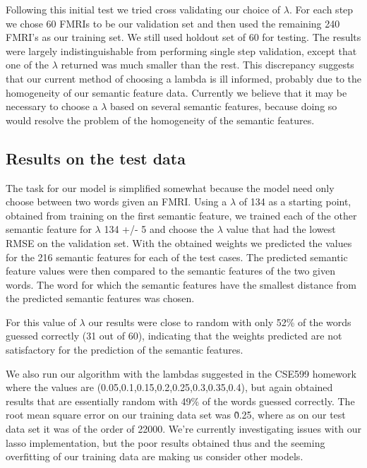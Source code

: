 \documentclass{article} %
\begin{document}
Following this initial test we tried cross validating our choice of $\lambda$. For each step we chose 60 FMRIs to be our validation set and then used the remaining 240 FMRI's as our training set. We still used holdout set of 60 for testing. The results were largely indistinguishable from performing single step validation, except that one of the $\lambda$ returned was much smaller than the rest. This discrepancy suggests that our current method of choosing a lambda is ill informed, probably due to the homogeneity of our semantic feature data. Currently we believe that it may be necessary to choose a $\lambda$ based on several semantic features, because doing so would resolve the problem of the homogeneity of the semantic features.



\subsection{Results on the test data}

The task for our model is simplified somewhat because the model need only choose between two words given an FMRI. Using a $\lambda$ of 134 as a starting point, obtained from training on the first semantic feature, we trained each of the other semantic feature for $\lambda$ 134 +/- 5 and choose the $\lambda$ value that had the lowest RMSE on the validation set. With the obtained weights we predicted the values for the 216 semantic features for each of the test cases. The predicted semantic feature values were then compared to the semantic features of the two given words. The word for which the semantic features have the smallest distance from the predicted semantic features was chosen. 

For this value of $\lambda$ our results were close to random with only 52\% of the words guessed correctly (31 out of 60), indicating that the weights predicted are not satisfactory for the prediction of the semantic features.

We also run our algorithm with the lambdas suggested in the CSE599 homework where the values are (0.05,0.1,0.15,0.2,0.25,0.3,0.35,0.4), but again obtained results that are essentially random with 49\% of the words guessed correctly. The root mean square error on our training data set was \~0.25, where as on our test data set it was of the order of 22000. We're currently investigating issues with our lasso implementation, but the poor results obtained thus and the seeming overfitting of our training data are making us consider other models.
\end{document}
